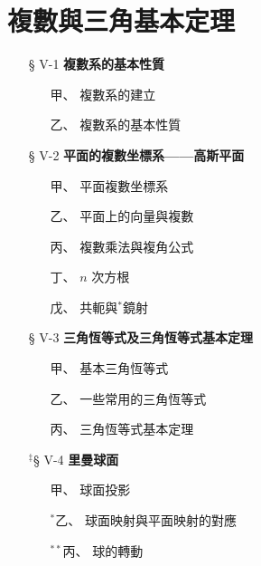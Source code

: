 
\section[複數與三角基本定理（在高三第一學期講授）]{複數與三角基本定理}
\label{sec:b4s-ch5}

\begin{center}
\begin{minipage}{0.75\textwidth}
\begin{itemize}[leftmargin=2em, itemsep=0.3em]
  \item[§ V-1] \textbf{複數系的基本性質}
  \begin{itemize}[leftmargin=2em, itemsep=0.2em]
    \item[甲、] 複數系的建立
    \item[乙、] 複數系的基本性質
  \end{itemize}
  \item[§ V-2] \textbf{平面的複數坐標系——高斯平面}
  \begin{itemize}[leftmargin=2em, itemsep=0.2em]
    \item[甲、] 平面複數坐標系
    \item[乙、] 平面上的向量與複數
    \item[丙、] 複數乘法與複角公式
    \item[丁、] $n$ 次方根
    \item[戊、] 共軛與$^*$鏡射
  \end{itemize}
  \item[§ V-3] \textbf{三角恆等式及三角恆等式基本定理}
  \begin{itemize}[leftmargin=2em, itemsep=0.2em]
    \item[甲、] 基本三角恆等式
    \item[乙、] 一些常用的三角恆等式
    \item[丙、] 三角恆等式基本定理
  \end{itemize}
  \item[${}^\ddagger$§ V-4] \textbf{里曼球面}
  \begin{itemize}[leftmargin=2em, itemsep=0.2em]
    \item[甲、] 球面投影
    \item[$^*$乙、] 球面映射與平面映射的對應
    \item[$^{**}$丙、] 球的轉動
  \end{itemize}
\end{itemize}
\end{minipage}
\end{center}

